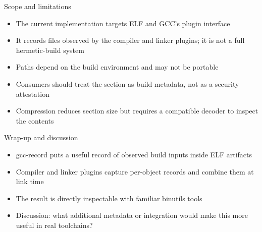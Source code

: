 \documentclass[aspectratio=169]{beamer}
\begin{document}
\begin{frame}{Scope and limitations}
  \begin{itemize}
    \item The current implementation targets ELF and GCC's plugin interface
    \item It records files observed by the compiler and linker plugins; it is not a full hermetic-build system
    \item Paths depend on the build environment and may not be portable
    \item Consumers should treat the section as build metadata, not as a security attestation
    \item Compression reduces section size but requires a compatible decoder to inspect the contents
  \end{itemize}
\end{frame}

\begin{frame}{Wrap-up and discussion}
  \begin{itemize}
    \item gcc-record puts a useful record of observed build inputs inside ELF artifacts
    \item Compiler and linker plugins capture per-object records and combine them at link time
    \item The result is directly inspectable with familiar binutils tools
    \item Discussion: what additional metadata or integration would make this more useful in real toolchains?
  \end{itemize}
\end{frame}
\end{document}
